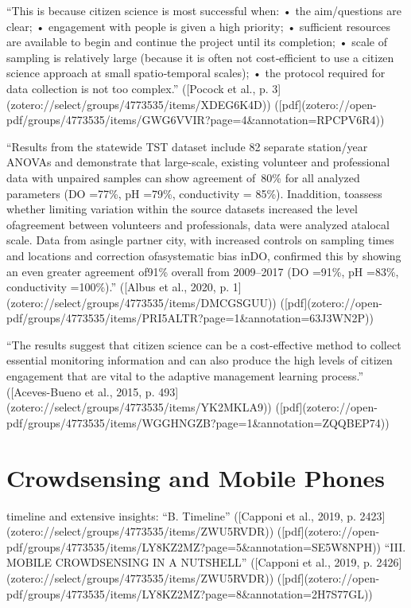“This is because citizen  science is most successful when:   
• the aim/questions are clear;  
• engagement with people is given a high priority;  
• sufficient resources are available to begin and continue the project until its completion;  
• scale of sampling is relatively large (because it is often not cost‐efficient to use a citizen  science approach at small spatio‐temporal scales);  
• the protocol required for data collection is not too complex.”
([Pocock et al., p. 3](zotero://select/groups/4773535/items/XDEG6K4D)) ([pdf](zotero://open-pdf/groups/4773535/items/GWG6VVIR?page=4&annotation=RPCPV6R4))


“Results from the statewide TST dataset include 82 separate station/year ANOVAs and demonstrate that large-scale, existing volunteer and professional data with unpaired samples can show agreement of~80\% for all analyzed parameters (DO =77\%, pH =79\%, conductivity = 85\%). Inaddition, toassess whether limiting variation within the source datasets increased the level ofagreement between volunteers and professionals, data were analyzed atalocal scale. Data from asingle partner city, with increased controls on sampling times and locations and correction ofasystematic bias inDO, confirmed this by showing an even greater agreement of91\% overall from 2009–2017 (DO =91\%, pH =83\%, conductivity =100\%).” ([Albus et al., 2020, p. 1](zotero://select/groups/4773535/items/DMCGSGUU)) ([pdf](zotero://open-pdf/groups/4773535/items/PRI5ALTR?page=1\&annotation=63J3WN2P))

“The results suggest that citizen science can be a cost-effective method to collect essential monitoring information and can also produce the high levels of citizen engagement that are vital to the adaptive management learning process.” ([Aceves-Bueno et al., 2015, p. 493](zotero://select/groups/4773535/items/YK2MKLA9)) ([pdf](zotero://open-pdf/groups/4773535/items/WGGHNGZB?page=1&annotation=ZQQBEP74))


\section{Crowdsensing and Mobile Phones}
timeline and extensive insights:
“B. Timeline” ([Capponi et al., 2019, p. 2423](zotero://select/groups/4773535/items/ZWU5RVDR)) ([pdf](zotero://open-pdf/groups/4773535/items/LY8KZ2MZ?page=5&annotation=SE5W8NPH))
“III. MOBILE CROWDSENSING IN A NUTSHELL” ([Capponi et al., 2019, p. 2426](zotero://select/groups/4773535/items/ZWU5RVDR)) ([pdf](zotero://open-pdf/groups/4773535/items/LY8KZ2MZ?page=8&annotation=2H7S77GL))

